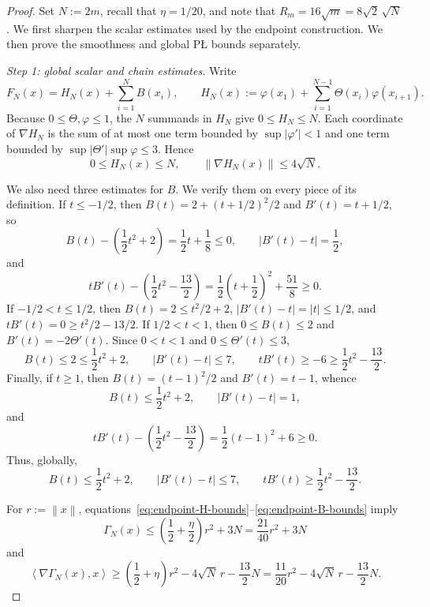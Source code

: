 \documentclass[11pt]{article}
\newcommand{\norm}[1]{\left\lVert #1\right\rVert}
\newcommand{\abs}[1]{\left\lvert #1\right\rvert}
\newcommand{\ip}[2]{\left\langle #1,#2\right\rangle}
\begin{document}
\begin{proof}
Set $N:=2m$, recall that $\eta=1/20$, and note that
$R_m=16\sqrt m=8\sqrt2\,\sqrt N$. We first sharpen the scalar estimates used by the endpoint construction. We then
prove the smoothness and global P\L{} bounds separately.

\emph{Step 1: global scalar and chain estimates.}
Write
\[
F_N(x)=H_N(x)+\sum_{i=1}^N B(x_i),
\qquad
H_N(x):=\varphi(x_1)+\sum_{i=1}^{N-1}\Theta(x_i)\varphi(x_{i+1}).
\]
Because $0\le\Theta,\varphi\le1$, the $N$ summands in $H_N$ give $0\le H_N\le N$. Each coordinate of
$\nabla H_N$ is the sum of at most one term bounded by $\sup|\varphi'|<1$ and one term bounded by
$\sup|\Theta'|\sup\varphi\le3$. Hence
\begin{equation}
\label{eq:endpoint-H-bounds}
0\le H_N(x)\le N,
\qquad
\norm{\nabla H_N(x)}\le4\sqrt N.
\end{equation}

We also need three estimates for $B$. We verify them on every piece of its definition. If $t\le-1/2$, then
$B(t)=2+(t+1/2)^2/2$ and $B'(t)=t+1/2$, so
\[
B(t)-\left(\frac12t^2+2\right)
=\frac12t+\frac18\le0,
\qquad
\abs{B'(t)-t}=\frac12,
\]
and
\[
tB'(t)-\left(\frac12t^2-\frac{13}{2}\right)
=\frac12\left(t+\frac12\right)^2+\frac{51}{8}\ge0.
\]
If $-1/2<t\le1/2$, then $B(t)=2\le t^2/2+2$, $\abs{B'(t)-t}=\abs{t}\le1/2$, and
$tB'(t)=0\ge t^2/2-13/2$. If
$1/2<t<1$, then $0\le B(t)\le2$ and $B'(t)=-2\Theta'(t)$. Since $0<t<1$ and
$0\le\Theta'(t)\le3$,
\[
B(t)\le2\le\frac12t^2+2,
\qquad
\abs{B'(t)-t}\le7,
\qquad
tB'(t)\ge-6\ge\frac12t^2-\frac{13}{2}.
\]
Finally, if $t\ge1$, then $B(t)=(t-1)^2/2$ and $B'(t)=t-1$, whence
\[
B(t)\le\frac12t^2+2,
\qquad
\abs{B'(t)-t}=1,
\]
and
\[
tB'(t)-\left(\frac12t^2-\frac{13}{2}\right)
=\frac12(t-1)^2+6\ge0.
\]
Thus, globally,
\begin{equation}
\label{eq:endpoint-B-bounds}
B(t)\le\frac12t^2+2,
\qquad
\abs{B'(t)-t}\le7,
\qquad
tB'(t)\ge\frac12t^2-\frac{13}{2}.
\end{equation}

For $r:=\norm{x}$, equations~\eqref{eq:endpoint-H-bounds}--\eqref{eq:endpoint-B-bounds} imply
\begin{equation}
\label{eq:endpoint-Gamma-global-growth}
\Gamma_N(x)
\le
\left(\frac12+\frac{\eta}{2}\right)r^2+3N
=\frac{21}{40}r^2+3N
\end{equation}
and
\begin{equation}
\label{eq:endpoint-Gamma-radial}
\ip{\nabla\Gamma_N(x)}{x}
\ge
\left(\frac12+\eta\right)r^2-4\sqrt N\,r-\frac{13}{2}N
=\frac{11}{20}r^2-4\sqrt N\,r-\frac{13}{2}N.
\end{equation}


\end{proof}
\end{document}
